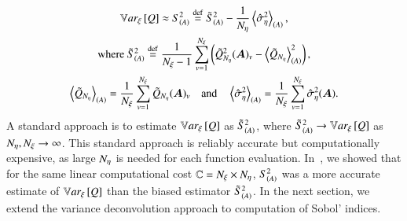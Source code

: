 \begin{gather} \label{m2eq:var-deconv}
    \mathbb{V}ar_{\xi}\left[Q\right] \approx S^2_{\left( A \right)} \overset{\operatorname{def}}{=} \tilde{S}^2_{\left( A \right)} - \frac{1}{{N_\eta}}\left< \hat{\sigma}^2_\eta \right>_{\left(A \right)} ,\\ \label{m2eq:samp-var}
    \text{where } \tilde{S}^2_{\left( A \right)} \overset{\operatorname{def}}{=} \frac{1}{{N_\xi} - 1} \sum_{v=1}^{{N_\xi}} \left( \tilde{Q}_{{N_\eta}}^2 (\bm{A})_v - \left< \tilde{Q}_{{N_\eta}} \right>_{\left(A \right)}^2 \right) , \\ \nonumber 
    \left< \tilde{Q}_{{N_\eta}} \right>_{\left(A \right)} = \frac{1}{{N_\xi}} \sum_{v=1}^{{N_\xi}} \tilde{Q}_{{N_\eta}}(\bm{A})_v \quad \text{and} \quad \left< \hat{\sigma}^2_\eta \right>_{\left(A \right)} = \frac{1}{{N_\xi}} \sum_{v=1}^{{N_\xi}} \hat{\sigma}^2_\eta(\bm{A}) .
\end{gather}
A standard approach is to estimate $\mathbb{V}ar_{\xi}\left[Q\right]$ as $\tilde{S}^2_{\left( A \right)}$, where $\tilde{S}^2_{\left( A \right)} \rightarrow \mathbb{V}ar_{\xi}\left[Q\right]$ as ${N_\eta},{N_\xi} \rightarrow \infty$. 
This standard approach is reliably accurate but computationally expensive, as large ${N_\eta}$ is needed for each function evaluation.
In~\cite{clements-etal-2024}, we showed that for the same linear computational cost $\mathbb{C} = {N_\xi} \times {N_\eta}$, $S^2_{\left( A \right)}$ was a more accurate estimate of $\mathbb{V}ar_{\xi}\left[Q\right]$ than the biased estimator $\tilde{S}^2_{\left( A \right)}$. 
In the next section, we extend the variance deconvolution approach to computation of Sobol' indices. 